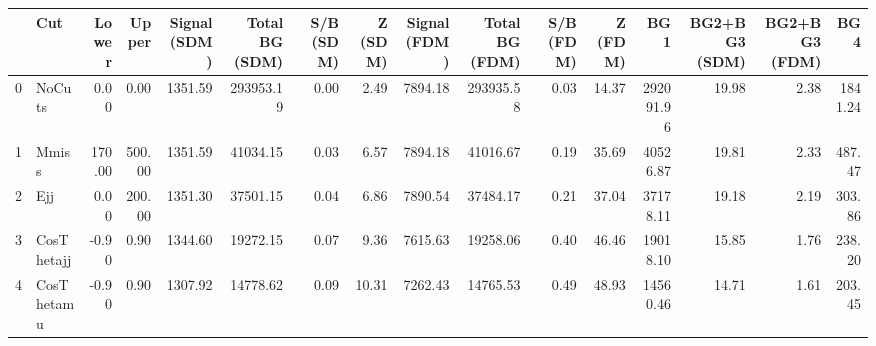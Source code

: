 \begin{tabular}{llrrrrrrrrrrrrrr}
\toprule
{} &         Cut &  Lower &  Upper &  Signal (SDM) &  Total BG (SDM) &  S/B (SDM) &  Z (SDM) &  Signal (FDM) &  Total BG (FDM) &  S/B (FDM) &  Z (FDM) &       BG1 &  BG2+BG3 (SDM) &  BG2+BG3 (FDM) &    BG4  \\
\midrule
0 &      NoCuts &   0.00 &   0.00 &       1351.59 &       293953.19 &       0.00 &     2.49 &       7894.18 &       293935.58 &       0.03 &    14.37 & 292091.96 &          19.98 &           2.38 & 1841.24 \\
1 &       Mmiss & 170.00 & 500.00 &       1351.59 &        41034.15 &       0.03 &     6.57 &       7894.18 &        41016.67 &       0.19 &    35.69 &  40526.87 &          19.81 &           2.33 &  487.47 \\
2 &         Ejj &   0.00 & 200.00 &       1351.30 &        37501.15 &       0.04 &     6.86 &       7890.54 &        37484.17 &       0.21 &    37.04 &  37178.11 &          19.18 &           2.19 &  303.86 \\
3 &  CosThetajj &  -0.90 &   0.90 &       1344.60 &        19272.15 &       0.07 &     9.36 &       7615.63 &        19258.06 &       0.40 &    46.46 &  19018.10 &          15.85 &           1.76 &  238.20 \\
4 &  CosThetamu &  -0.90 &   0.90 &       1307.92 &        14778.62 &       0.09 &    10.31 &       7262.43 &        14765.53 &       0.49 &    48.93 &  14560.46 &          14.71 &           1.61 &  203.45 \\
\bottomrule
\end{tabular}
